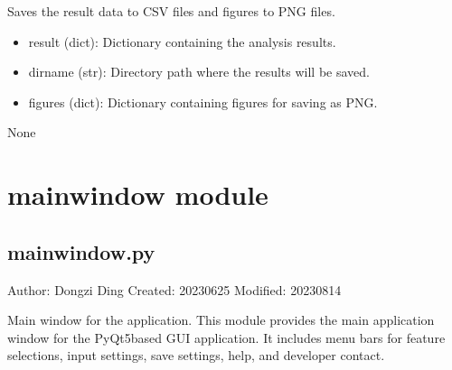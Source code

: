 \documentclass[a4paper,10pt,english]{sphinxmanual}
\begin{document}
\begin{fulllineitems}
\label{\detokenize{utils:src.utils.save.save}}
\pysigstartsignatures
{}
\pysigstopsignatures
\sphinxAtStartPar
Saves the result data to CSV files and figures to PNG files.
\begin{description}
\begin{itemize}
\item {} 
\sphinxAtStartPar
result (dict): Dictionary containing the analysis results.

\item {} 
\sphinxAtStartPar
dirname (str): Directory path where the results will be saved.

\item {} 
\sphinxAtStartPar
figures (dict): Dictionary containing figures for saving as PNG.

\end{itemize}

\sphinxAtStartPar
None

\end{description}

\end{fulllineitems}



\section{mainwindow module}
\label{\detokenize{src:module-src.mainwindow}}\label{\detokenize{src:mainwindow-module}}

\subsection{mainwindow.py}
\label{\detokenize{src:mainwindow-py}}
\sphinxAtStartPar
Author: Dongzi Ding
Created: 2023\sphinxhyphen{}06\sphinxhyphen{}25
Modified: 2023\sphinxhyphen{}08\sphinxhyphen{}14

\sphinxAtStartPar
Main window for the application.
This module provides the main application window for the PyQt5\sphinxhyphen{}based GUI application.
It includes menu bars for feature selections, input settings, save settings, help, and developer contact.
\end{document}
